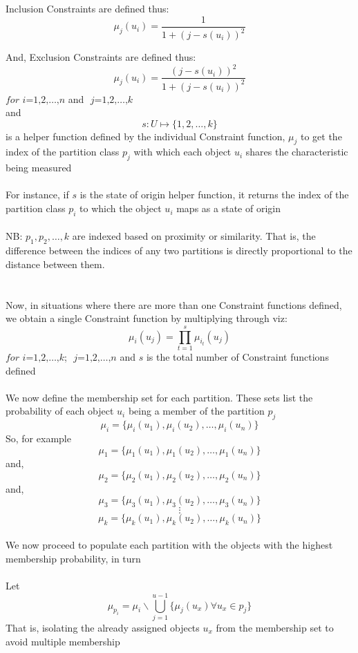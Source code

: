 \documentclass{article}
\begin{document}
			Inclusion Constraints are defined thus:
			\[
				\mu_j(u_i) = \frac{1}{1+\left( j - s(u_i) \right)^2}
			\]
			
			And, Exclusion Constraints are defined thus:
			\[
				\mu_j(u_i) = \frac{\left( j - s(u_i) \right)^2}{1+\left( j - s(u_i) \right)^2}
			\]
			$\textit{for i=1,2,}\dots\text{,}n$ and $\textit{ j=1,2,}\dots\text{,}k$\\
			and
			\[
				s\colon U\mapsto \{ 1,2,\dots,k \}
			\]
			is a helper function defined by the individual Constraint function, $\mu_j$ to get the index of the partition class $p_j$ with which each object $u_i$ shares the characteristic being measured\\ \\
			For instance, if $s$ is the state of origin helper function, it returns the index of the partition class $p_i$ to which the object $u_i$ maps as a state of origin\\ \\
			NB: $p_1, p_2,\dots,k$ are indexed based on proximity or similarity. That is, the difference between the indices of any two partitions is directly proportional to the distance between them. \\ \\
		\paragraph{}
			Now, in situations where there are more than one Constraint functions defined, we obtain a single Constraint function by multiplying through viz:
			\[
				\mu_i(u_j) = \prod_{t=1}^{s}{\mu_{i_t}(u_j)}
			\]
			$\textit{for i=1,2,}\dots\text{,}k$; $\textit{ j=1,2,}\dots\text{,}n$ and $s$ is the total number of Constraint functions defined
		\paragraph{}
			We now define the membership set for each partition. These sets list the probability of each object $u_i$ being a member of the partition $p_j$
			\[
				\mu_i = \{ \mu_i(u_1), \mu_i(u_2),\dots,\mu_i(u_n) \}
			\]
			So, for example
			\[
				\mu_1 = \{ \mu_1(u_1), \mu_1(u_2),\dots,\mu_1(u_n) \}
			\]
			and,
			\[
				\mu_2 = \{ \mu_2(u_1), \mu_2(u_2),\dots,\mu_2(u_n) \}
			\]
			and,
			\[
				\mu_3 = \{ \mu_3(u_1), \mu_3(u_2),\dots,\mu_3(u_n) \}
			\]
			\[
				\vdots
			\]
			\[
				\mu_k = \{ \mu_k(u_1), \mu_k(u_2),\dots,\mu_k(u_n) \}
			\]
		\paragraph{}
			We now proceed to populate each partition with the objects with the highest membership probability, in turn \\ \\
			Let
			\[
				\mu_{p_i} = \mu_i \backslash \bigcup_{j=1}^{u-1}{ \{ \mu_j(u_x) \forall u_x \in p_j \} }
			\]
			That is, isolating the already assigned objects $u_x$ from the membership set to avoid multiple membership
\end{document}

